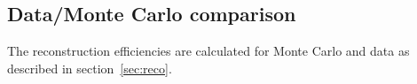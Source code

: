 \documentclass[a4paper,11pt]{article}
\begin{document}




\subsection{Data/Monte Carlo comparison}\label{sec:datamc}
The reconstruction efficiencies are calculated for Monte Carlo and data as described in section~\ref{sec:reco}. %
\end{document}
